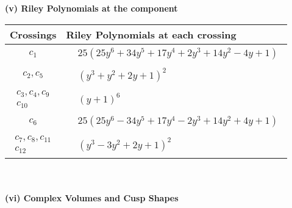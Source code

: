 \documentclass[1p]{elsarticle_modified}
\theoremstyle{definition}
\begin{document}
\newpage\renewcommand{\arraystretch}{1}
\flushleft \textbf{(v) Riley Polynomials at the component}\newline \\
\begin{tabular}{m{50pt}|m{274pt}}
Crossings & \hspace{64pt}Riley Polynomials at each crossing \\
\hline $$\begin{aligned}c_{1}\end{aligned}$$&$\begin{aligned}
&25(25 y^6+34 y^5+17 y^4+2 y^3+14 y^2-4 y+1)
\end{aligned}$\\
\hline $$\begin{aligned}c_{2},c_{5}\end{aligned}$$&$\begin{aligned}
&(y^3+y^2+2 y+1)^2
\end{aligned}$\\
\hline $$\begin{aligned}c_{3},c_{4},c_{9}\\c_{10}\end{aligned}$$&$\begin{aligned}
&(y+1)^6
\end{aligned}$\\
\hline $$\begin{aligned}c_{6}\end{aligned}$$&$\begin{aligned}
&25(25 y^6-34 y^5+17 y^4-2 y^3+14 y^2+4 y+1)
\end{aligned}$\\
\hline $$\begin{aligned}c_{7},c_{8},c_{11}\\c_{12}\end{aligned}$$&$\begin{aligned}
&(y^3-3 y^2+2 y+1)^2
\end{aligned}$\\
\hline
\end{tabular}\\~\\
\newpage\flushleft \textbf{(vi) Complex Volumes and Cusp Shapes}
\end{document}
